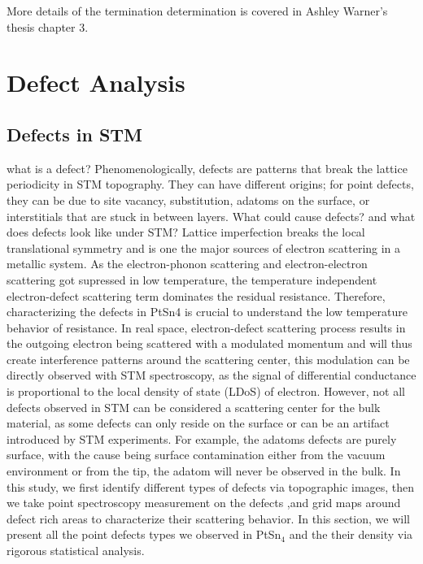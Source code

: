 More details of the termination determination is covered in Ashley Warner's thesis chapter 3.

\section{Defect Analysis}

\subsection{Defects in STM}
what is a defect?
Phenomenologically, defects are patterns that break the lattice periodicity in STM topography. They can have different origins; for point defects, they can be due to site vacancy, substitution, adatoms on the surface, or interstitials that are stuck in between layers.
What could cause defects? and what does defects look like under STM?
Lattice imperfection breaks the local translational symmetry and is one the major sources of electron scattering in a metallic system. As the electron-phonon scattering and electron-electron scattering got supressed in low temperature, the temperature independent electron-defect scattering term dominates the residual resistance. Therefore, characterizing the defects in PtSn4 is crucial to understand the low temperature behavior of resistance. In real space, electron-defect scattering process results in the outgoing electron being scattered with a modulated momentum and will thus create interference patterns around the scattering center, this modulation can be directly observed with STM spectroscopy, as the signal of differential conductance is proportional to the local density of state (LDoS) of electron. 
However, not all defects observed in STM can be considered a scattering center for the bulk material, as some defects can only reside on the surface or can be an artifact introduced by STM experiments.  For example, the adatoms defects are purely surface, with the cause being surface contamination either from the vacuum environment or from the tip, the adatom will never be observed in the bulk. 
In this study, we first identify different types of defects via topographic images, then we take point spectroscopy measurement on the defects ,and grid maps around defect rich areas to characterize their scattering behavior. In this section, we will present all the point defects types we observed in PtSn$_4$ and the their density via rigorous statistical analysis. 

